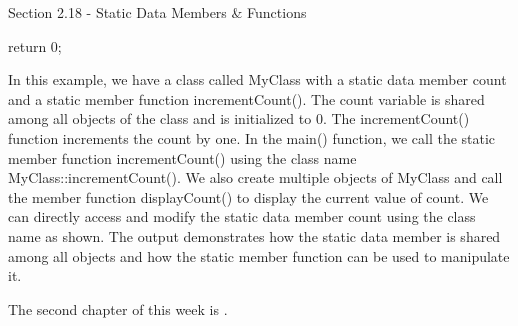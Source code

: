 \begin{notes}{Section 2.18 - Static Data Members \& Functions}
\begin{highlight}
\begin{code}[C++]
{        return 0;
    }
    \end{code}
        In this example, we have a class called MyClass with a static data member count and a static member function incrementCount(). The count variable is shared among all objects of the class and is initialized to 0. The incrementCount() function increments the count by one. In the main() function, we call the static member 
        function incrementCount() using the class name MyClass::incrementCount(). We also create multiple objects of MyClass and call the member function displayCount() to display the current value of count. We can directly access and modify the static data member count using the class name as shown. The output demonstrates how 
        the static data member is shared among all objects and how the static member function can be used to manipulate it.
    \end{highlight}
\end{notes}

The second chapter of this week is .

